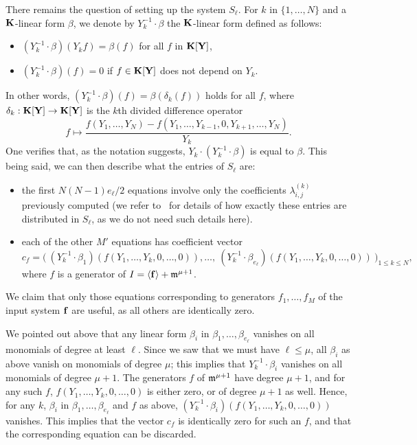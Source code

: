 \documentclass[12pt]{article}
\begin{document}
There remains the question of setting up the system $S_\ell$. For $k$
in $\{1,\dots,N\}$ and a $\mathbf{K}$-linear form $\beta$, we denote by
$Y_k^{-1} \cdot \beta$ the $\mathbf{K}$-linear form defined as follows:
\begin{itemize}
\item $(Y_k^{-1} \cdot \beta)(Y_k f) = \beta(f)$ for all $f$ in $\mathbf{K}[\mathbf{Y}]$,
\item $(Y_k^{-1} \cdot \beta)(f)=0$ if $f\in \mathbf{K}[\mathbf{Y}]$ does not depend on $Y_k$.
\end{itemize}
In other words, $(Y_k^{-1} \cdot \beta)(f)=\beta(\delta_k(f))$ holds
for all $f$, where $\delta_k:\mathbf{K}[\mathbf{Y}] \to \mathbf{K}[\mathbf{Y}]$ is the $k$th divided
difference operator
$$f\mapsto \frac
{f(Y_1,\dots,Y_N)-f(Y_1,\dots,Y_{k-1},0,Y_{k+1},\dots,Y_N)}{Y_k}.$$
One verifies that, as the notation suggests, $Y_k \cdot (Y_k^{-1}
\cdot \beta)$ is equal to $\beta$. This being said, we can then
describe what the entries of $S_\ell$ are:
\begin{itemize}
\item the first $N(N-1) e_\ell/2$ equations involve only the coefficients 
  $\lambda^{(k)}_{i,j}$ previously computed (we refer to~\cite[Section~4.4]{Mourrain97} for details of how exactly 
these entries are distributed in $S_\ell$, as we do not need such details here).
\item each of the other $M'$ equations has coefficient vector
$$c_f = \big (\
 (Y_k^{-1} \cdot \beta_1)(f(Y_1,\dots,Y_k,0,\dots,0)),\dots,\ (Y_k^{-1} \cdot \beta_{e_\ell})(f(Y_1,\dots,Y_k,0,\dots,0))\
\big )_{1 \le k \le N},$$
where $f$ is a generator of $I=\langle \mathbf{f} \rangle +\mathfrak{m}^{\mu+1}$.
\end{itemize}
We claim that only those equations corresponding to generators
$f_1,\dots,f_M$ of the input system $\mathbf{f}$ are useful, as all others are identically
zero.

We pointed out above that any linear form $\beta_i$ in
$\beta_1,\dots,\beta_{e_\ell}$ vanishes on all monomials of degree at
least $\ell$. Since we saw that we must have $\ell \le \mu$, all
$\beta_i$ as above vanish on monomials of degree $\mu$; this implies
that $Y_k^{-1}\cdot \beta_i$ vanishes on all monomials of degree
$\mu+1$. The generators $f$ of $\mathfrak{m}^{\mu+1}$ have degree $\mu+1$, and
for any such $f$, $f(Y_1,\dots,Y_k,0,\dots,0)$ is either zero, or of
degree $\mu+1$ as well. Hence, for any $k$, $\beta_i$ in
$\beta_1,\dots,\beta_{e_\ell}$ and $f$ as above, $(Y_k^{-1} \cdot
\beta_i)(f(Y_1,\dots,Y_k,0,\dots,0))$ vanishes. This implies that the
vector $c_f$ is identically zero for such an $f$, and that the
corresponding equation can be discarded.
\end{document}

